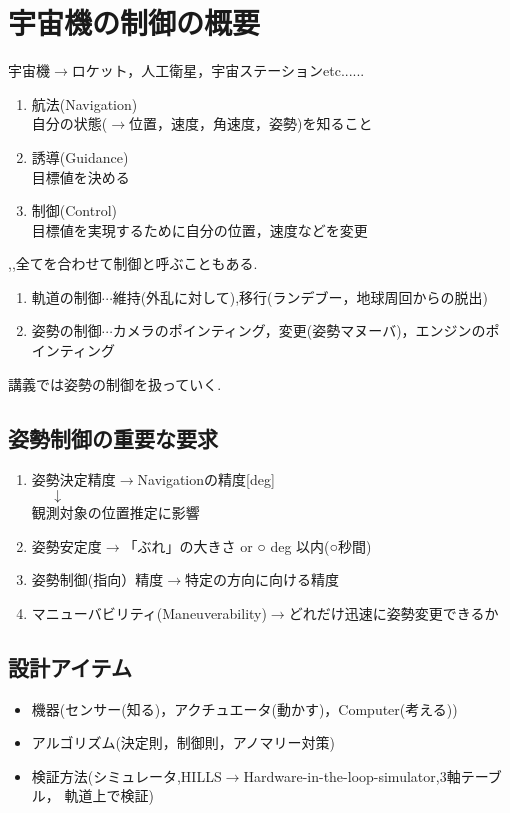 \documentclass[class=article, crop=false, dvipdfmx, fleqn]{standalone}
\begin{document}
\section{宇宙機の制御の概要}

宇宙機$\rightarrow$ロケット，人工衛星，宇宙ステーションetc......
\begin{enumerate}[label = \maru{\theenumi}]
\item 航法(Navigation)\\
自分の状態($\rightarrow$位置，速度，角速度，姿勢)を知ること
\item 誘導(Guidance)\\
目標値を決める
\item 制御(Control)\\
目標値を実現するために自分の位置，速度などを変更
\end{enumerate}
,,全てを合わせて制御と呼ぶこともある.

\begin{enumerate}
      \renewcommand{\labelenumi}{\alph{enumi}).}
      \item 軌道の制御$\cdots$維持(外乱に対して),移行(ランデブー，地球周回からの脱出)
      \item 姿勢の制御$\cdots$カメラのポインティング，変更(姿勢マヌーバ)，エンジンのポインティング
\end{enumerate}
講義では姿勢の制御を扱っていく.


\subsection{姿勢制御の重要な要求}
\begin{enumerate}
\item 姿勢決定精度$\rightarrow$Navigationの精度[deg]\\
		$\mbox{    　}\downarrow$\\
 観測対象の位置推定に影響
\item 姿勢安定度$\rightarrow$「ぶれ」の大きさ  or ○ deg 以内(○秒間)
\item 姿勢制御(指向）精度$\rightarrow$特定の方向に向ける精度
\item マニューバビリティ(Maneuverability)$\rightarrow$どれだけ迅速に姿勢変更できるか
\end{enumerate}


\subsection{設計アイテム}
\begin{itemize}
\item 機器(センサー(知る)，アクチュエータ(動かす)，Computer(考える))
\item アルゴリズム(決定則，制御則，アノマリー対策)
\item 検証方法(シミュレータ,HILLS$\rightarrow$Hardware-in-the-loop-simulator,3軸テーブル，
軌道上で検証)
\end{itemize}
\end{document}
